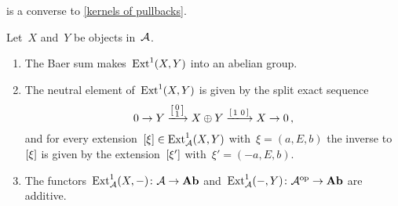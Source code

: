 \begin{remarknonum}
   is a converse to \cref{kernels of pullbacks}.
\end{remarknonum}


\begin{theorem}
  Let~$X$ and~$Y$ be objects in~$\mathcal{A}$.
  \begin{enumerate}
    \item
      The Baer sum makes~$\operatorname{Ext}^1(X,Y)$ into an abelian group.
    \item
      The neutral element of~$\operatorname{Ext}^1(X,Y)$ is given by the split exact sequence
      \[
        0
        \to
        Y
        \xlongto{ \begin{bsmallmatrix} 0 \\ 1 \end{bsmallmatrix} }
        X \oplus Y
        \xlongto{ \begin{bsmallmatrix} 1 & 0 \end{bsmallmatrix} }
        X
        \to
        0 \,,
      \]
      and for every extension~$[\xi] \in \operatorname{Ext}^1_{\mathcal{A}}(X,Y)$ with~$\xi = (a,E,b)$ the inverse to~$[\xi]$ is given by the extension~$[\xi']$ with~$\xi' = (-a,E,b)$.
    \item
      The functors~$\operatorname{Ext}^1_{\mathcal{A}}(X,-) \colon \mathcal{A} \to \mathbf{Ab}$ and~$\operatorname{Ext}^1_{\mathcal{A}}(-,Y) \colon \mathcal{A}^{\mathrm{op}} \to \mathbf{Ab}$ are additive.
  \end{enumerate}
\end{theorem}































